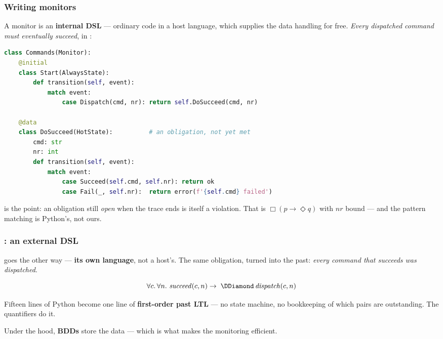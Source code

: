 \begin{frame}[fragile]
  \frametitle{Writing monitors} \small

A monitor is an {\bf internal DSL} --- ordinary code in a host language, which
supplies the data handling for free. {\em Every dispatched command must eventually
succeed}, in \pycontract{}:

\begin{lstlisting}[language=python]
class Commands(Monitor):
    @initial
    class Start(AlwaysState):
        def transition(self, event):
            match event:
                case Dispatch(cmd, nr): return self.DoSucceed(cmd, nr)

    @data
    class DoSucceed(HotState):          # an obligation, not yet met
        cmd: str
        nr: int
        def transition(self, event):
            match event:
                case Succeed(self.cmd, self.nr): return ok
                case Fail(_, self.nr):  return error(f'{self.cmd} failed')
\end{lstlisting}

\pause

 is the point: an obligation still {\em open} when the trace ends
is itself a violation. That is $\Box(p \rightarrow \Diamond q)$ with $nr$ bound ---
and the pattern matching is Python's, not ours.

\end{frame}

\begin{frame}[fragile]
  \frametitle{\dejavu{}: an external DSL} \small

\dejavu{} goes the other way --- {\bf its own language}, not a host's. The same
obligation, turned into the past: {\em every command that succeeds was dispatched}.

\[
\forall c.\,\forall n.\ \mathit{succeed}(c,n) \rightarrow\;
\DDiamond\, \mathit{dispatch}(c,n)
\]

Fifteen lines of Python become one line of {\bf first-order past LTL} --- no state
machine, no bookkeeping of which pairs are outstanding. The quantifiers do it.

\pause
\vspace{0.3cm}

\begin{block}{}\small
\centering
Under the hood, {\bf BDDs} store the data --- which is what makes the monitoring
efficient.
\end{block}

\end{frame}


